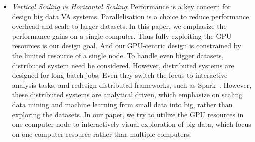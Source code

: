 \begin{itemize}
	\item \textit{Vertical Scaling vs Horizontal Scaling}:
	Performance is a key concern for design big data VA systems. Parallelization is a choice to reduce performance overhead and scale to larger datasets. In this paper, we emphasize the performance gains on a single computer. Thus fully exploiting the GPU resources is our design goal. And our GPU-centric design is constrained by the limited resource of a single node. To handle even bigger datasets, distributed system need be considered. However, distributed systems are designed for long batch jobs. Even they switch the focus to interactive analysis tasks, and redesign distributed frameworks, such as Spark~\cite{Zaharia:2010}. However, these distributed systems are analytical driven, which emphasize on scaling data mining and machine learning from small data into big, rather than exploring the datasets. In our paper, we try to utilize the GPU resources in one computer node to interactively visual exploration of big data, which focus on one computer resource rather than multiple computers.  

	
 
	
\end{itemize}